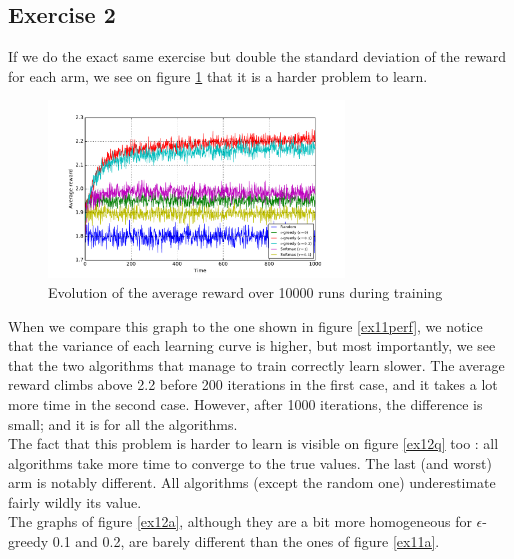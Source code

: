 \documentclass[a4paper]{article}
\begin{document}
\subsection{Exercise 2}
If we do the exact same exercise but double the standard deviation of the reward
for each arm, we see on figure \ref{ex12perf} that it is a harder problem to 
learn.
\begin{figure}[H]
	\centering
	\includegraphics[width=0.7\textwidth]{./fig/ex1-2.pdf}
	\caption{Evolution of the average reward over 10000 runs during training}
	\label{ex12perf}
\end{figure}
When we compare this graph to the one shown in figure \ref{ex11perf}, we
notice that the variance of each learning curve is higher, but most importantly,
we see that the two algorithms that manage to train correctly learn slower. 
The average reward climbs above 2.2 before 200 iterations in the first case,
and it takes a lot more time in the second case. However, after 1000 iterations,
the difference is small; and it is for all the algorithms.\\

The fact that this problem is harder to learn is visible on figure \ref{ex12q}
too : all algorithms take more time to converge to the true values. The last
(and worst) arm is notably different. All algorithms (except the random one)
underestimate fairly wildly its value.\\

The graphs of figure \ref{ex12a}, although they are a bit more homogeneous for
$\epsilon$-greedy 0.1 and 0.2, are barely different than the ones of figure
\ref{ex11a}.
\end{document}

